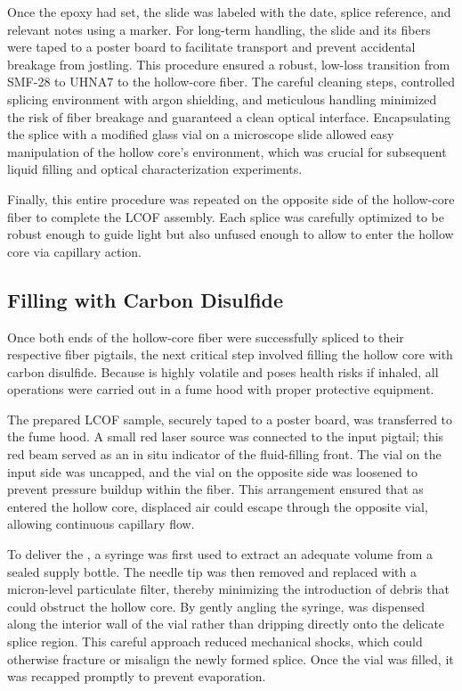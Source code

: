 Once the epoxy had set, the slide was labeled with the date, splice reference, and relevant notes using a marker. For long-term handling, the slide and its fibers were taped to a poster board to facilitate transport and prevent accidental breakage from jostling. This procedure ensured a robust, low-loss transition from \ac{SMF-28} to \ac{UHNA7} to the hollow-core fiber. The careful cleaning steps, controlled splicing environment with argon shielding, and meticulous handling minimized the risk of fiber breakage and guaranteed a clean optical interface. Encapsulating the splice with a modified glass vial on a microscope slide allowed easy manipulation of the hollow core’s environment, which was crucial for subsequent liquid filling and optical characterization experiments.

Finally, this entire procedure was repeated on the opposite side of the hollow-core fiber to complete the \ac{LCOF} assembly. Each splice was carefully optimized to be robust enough to guide light but also unfused enough to allow  to enter the hollow core via capillary action.

\subsection{Filling with Carbon Disulfide}
\label{Cooling:Appendix:subsec:Filling with CS2}

Once both ends of the hollow-core fiber were successfully spliced to their respective fiber pigtails, the next critical step involved filling the hollow core with carbon disulfide. Because  is highly volatile and poses health risks if inhaled, all operations were carried out in a fume hood with proper protective equipment.

The prepared \ac{LCOF} sample, securely taped to a poster board, was transferred to the fume hood. A small red laser source was connected to the input pigtail; this red beam served as an in situ indicator of the fluid-filling front. The vial on the input side was uncapped, and the vial on the opposite side was loosened to prevent pressure buildup within the fiber. This arrangement ensured that as  entered the hollow core, displaced air could escape through the opposite vial, allowing continuous capillary flow.

To deliver the , a syringe was first used to extract an adequate volume from a sealed supply bottle. The needle tip was then removed and replaced with a micron-level particulate filter, thereby minimizing the introduction of debris that could obstruct the hollow core. By gently angling the syringe,  was dispensed along the interior wall of the vial rather than dripping directly onto the delicate splice region. This careful approach reduced mechanical shocks, which could otherwise fracture or misalign the newly formed splice. Once the vial was filled, it was recapped promptly to prevent evaporation.

